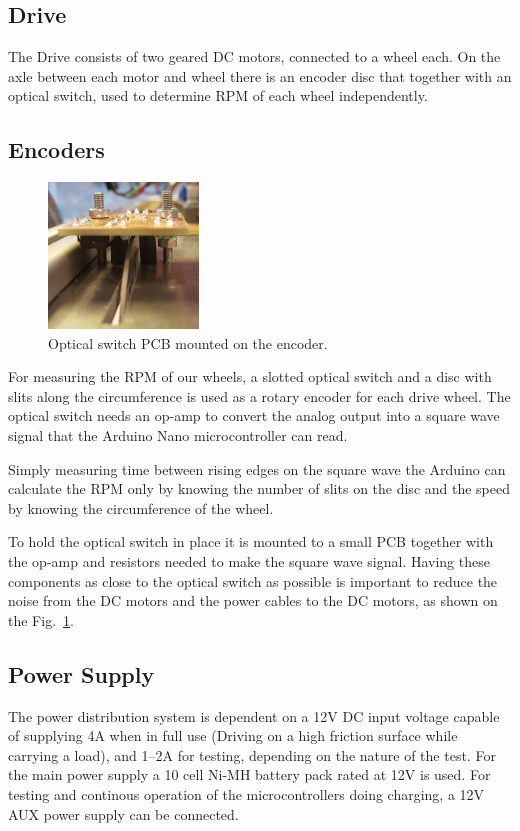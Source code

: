 \documentclass[11pt]{article}
\begin{document}
\subsection*{Drive}
The Drive consists of two geared DC motors, connected to a wheel each. On the axle between each motor and wheel there is an encoder disc that together with an optical switch, used to determine RPM of each wheel independently.

\subsection*{Encoders}
\begin{figure}
  \includegraphics[width=4cm]{mounted_encoder.jpg}
  \caption{Optical switch PCB mounted on the encoder.}
  \label{mounted-encoder}
\end{figure}


For measuring the RPM of our wheels, a slotted optical switch and a disc with slits along the circumference is used as a rotary encoder for each drive wheel. The optical switch needs an op-amp to convert the analog output into a square wave signal that the Arduino Nano microcontroller can read.


Simply measuring time between rising edges on the square wave the Arduino can calculate the RPM only by knowing the number of slits on the disc and the speed by knowing the circumference of the wheel.


To hold the optical switch in place it is mounted to a small PCB together with the op-amp and resistors needed to make the square wave signal. Having these components as close to the optical switch as possible is important to reduce the noise from the DC motors and the power cables to the DC motors, as shown on the Fig.~\ref{mounted-encoder}.
\subsection*{Power Supply}


The power distribution system is dependent on a 12V DC input voltage capable of supplying 4A when in full use (Driving on a high friction surface while carrying a load), and 1--2A for testing, depending on the nature of the test. For the main power supply a 10 cell Ni-MH battery pack rated at 12V is used. For testing and continous operation of the microcontrollers doing charging, a 12V AUX power supply can be connected.
\end{document}

